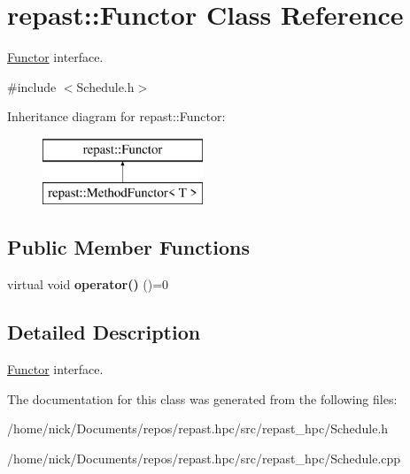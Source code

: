 \hypertarget{classrepast_1_1_functor}{\section{repast\-:\-:Functor Class Reference}
\label{classrepast_1_1_functor}
}


\hyperlink{classrepast_1_1_functor}{Functor} interface.  




{\ttfamily \#include $<$Schedule.\-h$>$}

Inheritance diagram for repast\-:\-:Functor\-:\begin{figure}[H]
\begin{center}
\leavevmode
\includegraphics[height=2.000000cm]{classrepast_1_1_functor}
\end{center}
\end{figure}
\subsection*{Public Member Functions}
\begin{DoxyCompactItemize}
\item 
\hypertarget{classrepast_1_1_functor_adadfddb7b4d7da5f105287498ff4d7d8}{virtual void {\bfseries operator()} ()=0}\label{classrepast_1_1_functor_adadfddb7b4d7da5f105287498ff4d7d8}

\end{DoxyCompactItemize}


\subsection{Detailed Description}
\hyperlink{classrepast_1_1_functor}{Functor} interface. 

The documentation for this class was generated from the following files\-:\begin{DoxyCompactItemize}
\item 
/home/nick/\-Documents/repos/repast.\-hpc/src/repast\-\_\-hpc/Schedule.\-h\item 
/home/nick/\-Documents/repos/repast.\-hpc/src/repast\-\_\-hpc/Schedule.\-cpp\end{DoxyCompactItemize}
